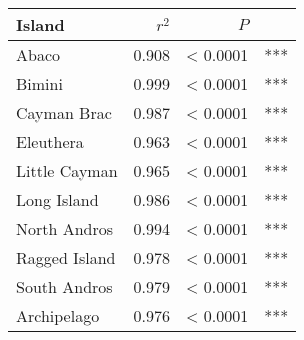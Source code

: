 
\begin{tabular}{lrrl}
\toprule
Island & $r^2$ & $P$ & \\
\midrule
Abaco & 0.908 & < 0.0001 & ***\\
Bimini & 0.999 & < 0.0001 & ***\\
Cayman Brac & 0.987 & < 0.0001 & ***\\
Eleuthera & 0.963 & < 0.0001 & ***\\
Little Cayman & 0.965 & < 0.0001 & ***\\
Long Island & 0.986 & < 0.0001 & ***\\
North Andros & 0.994 & < 0.0001 & ***\\
Ragged Island & 0.978 & < 0.0001 & ***\\
South Andros & 0.979 & < 0.0001 & ***\\
Archipelago & 0.976 & < 0.0001 & ***\\
\bottomrule
\end{tabular}
